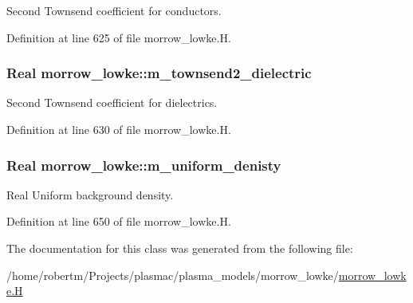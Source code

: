 Second Townsend coefficient for conductors. 



Definition at line 625 of file morrow\+\_\+lowke.\+H.

\subsubsection[{\texorpdfstring{m\+\_\+townsend2\+\_\+dielectric}{m_townsend2_dielectric}}]{\setlength{\rightskip}{0pt plus 5cm}Real morrow\+\_\+lowke\+::m\+\_\+townsend2\+\_\+dielectric}\hypertarget{classmorrow__lowke_a3e076d4dfbadde58715452aef8071513}{}\label{classmorrow__lowke_a3e076d4dfbadde58715452aef8071513}


Second Townsend coefficient for dielectrics. 



Definition at line 630 of file morrow\+\_\+lowke.\+H.

\subsubsection[{\texorpdfstring{m\+\_\+uniform\+\_\+denisty}{m_uniform_denisty}}]{\setlength{\rightskip}{0pt plus 5cm}Real morrow\+\_\+lowke\+::m\+\_\+uniform\+\_\+denisty}\hypertarget{classmorrow__lowke_af5b6093cc717fbf42326e8c99f942efa}{}\label{classmorrow__lowke_af5b6093cc717fbf42326e8c99f942efa}


Real Uniform background density. 



Definition at line 650 of file morrow\+\_\+lowke.\+H.



The documentation for this class was generated from the following file\+:\begin{DoxyCompactItemize}
\item 
/home/robertm/\+Projects/plasmac/plasma\+\_\+models/morrow\+\_\+lowke/\hyperlink{morrow__lowke_8H}{morrow\+\_\+lowke.\+H}\end{DoxyCompactItemize}
